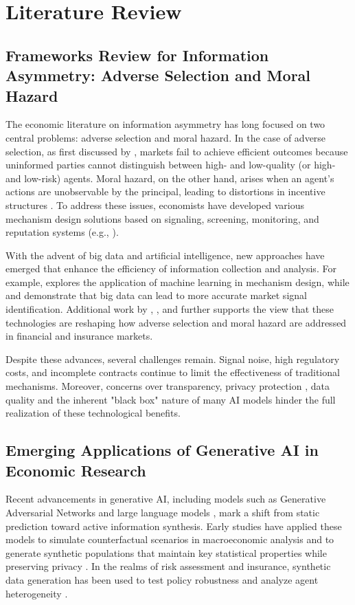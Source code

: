 \section{Literature Review}
\subsection{Frameworks Review for Information Asymmetry: Adverse Selection and Moral Hazard}
The economic literature on information asymmetry has long focused on two central problems: adverse selection and moral hazard. In the case of adverse selection, as first discussed by \citet{akerlof1970market}, markets fail to achieve efficient outcomes because uninformed parties cannot distinguish between high- and low-quality (or high- and low-risk) agents. Moral hazard, on the other hand, arises when an agent's actions are unobservable by the principal, leading to distortions in incentive structures \citep{holmstrom1979moral, grossman1983analysis}. To address these issues, economists have developed various mechanism design solutions based on signaling, screening, monitoring, and reputation systems (e.g., \citealp{myerson1981optimal, maskin1984optimal,laffont2009theory}).

With the advent of big data and artificial intelligence, new approaches have emerged that enhance the efficiency of information collection and analysis. For example, \citet{athey2019machine} explores the application of machine learning in mechanism design, while \citet{einav2014economics} and \citet{agrawal2018prediction} demonstrate that big data can lead to more accurate market signal identification. Additional work by \citet{fuster2022predictably}, \citet{varian2010computer}, \citet{einav2014data} and \citet{gatteschi2018blockchain} further supports the view that these technologies are reshaping how adverse selection and moral hazard are addressed in financial and insurance markets.

Despite these advances, several challenges remain. Signal noise, high regulatory costs, and incomplete contracts \citep{hart1988incomplete} continue to limit the effectiveness of traditional mechanisms. Moreover, concerns over transparency, privacy protection \citep{acquisti2016economics}, data quality and the inherent "black box" nature of many AI models hinder the full realization of these technological benefits.

\subsection{Emerging Applications of Generative AI in Economic Research}
Recent advancements in generative AI, including models such as Generative Adversarial Networks \citep{goodfellow2014generative} and large language models \citep{brown2020language}, mark a shift from static prediction toward active information synthesis. Early studies have applied these models to simulate counterfactual scenarios in macroeconomic analysis and to generate synthetic populations that maintain key statistical properties while preserving privacy \citep{assefa2020generating}. In the realms of risk assessment and insurance, synthetic data generation has been used to test policy robustness and analyze agent heterogeneity \citep{xu2019modeling}.


